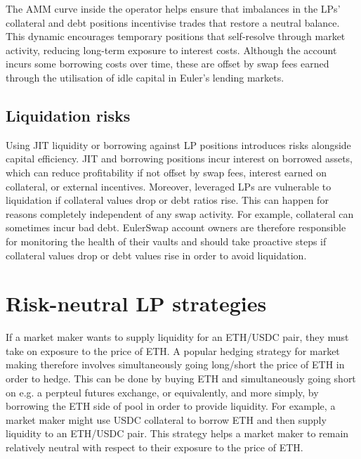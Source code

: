 \documentclass{article}
\begin{document}
The AMM curve inside the operator helps ensure that imbalances in the LPs' collateral and debt positions incentivise trades that restore a neutral balance. This dynamic encourages temporary positions that self-resolve through market activity, reducing long-term exposure to interest costs. Although the account incurs some borrowing costs over time, these are offset by swap fees earned through the utilisation of idle capital in Euler's lending markets.

\subsection{Liquidation risks}

Using JIT liquidity or borrowing against LP positions introduces risks alongside capital efficiency. JIT and borrowing positions incur interest on borrowed assets, which can reduce profitability if not offset by swap fees, interest earned on collateral, or external incentives. Moreover, leveraged LPs are vulnerable to liquidation if collateral values drop or debt ratios rise. This can happen for reasons completely independent of any swap activity. For example, collateral can sometimes incur bad debt. EulerSwap account owners are therefore responsible for monitoring the health of their vaults and should take proactive steps if collateral values drop or debt values rise in order to avoid liquidation. 

\section{Risk-neutral LP strategies}

If a market maker wants to supply liquidity for an ETH/USDC pair, they must take on exposure to the price of ETH. A popular hedging strategy for market making therefore involves simultaneously going long/short the price of ETH in order to hedge. This can be done by buying ETH and simultaneously going short on e.g. a perpteul futures exchange, or equivalently, and more simply, by borrowing the ETH side of pool in order to provide liquidity. For example, a market maker might use USDC collateral to borrow ETH and then supply liquidity to an ETH/USDC pair. This strategy helps a market maker to remain relatively neutral with respect to their exposure to the price of ETH.
\end{document}
